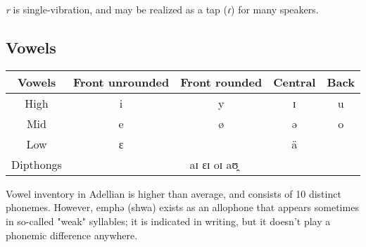 \documentclass[12pt]{article}
\begin{document}
	\emph{r} is single-vibration, and may be realized as a tap (\emph{ɾ}) for many speakers.
	
	\subsection{Vowels}
	
	\begin{tabular}{|| c | c c c c }
		Vowels & Front unrounded & Front rounded & Central & Back \\
		\hline
		High & i & y & ɪ & u \\
		Mid & e & ø & ə & o \\
		Low & ɛ & & ä & \\
		Dipthongs & \multicolumn{4}{c}{aɪ ɛɪ oɪ aʊ̯} \\
	\end{tabular}

	Vowel inventory in Adellian is higher than average, and consists of 10 distinct phonemes. However, emph{ə} (shwa) exists as an allophone that appears sometimes in so-called "weak" syllables; it is indicated in writing, but it doesn't play a phonemic difference anywhere.
\end{document}
